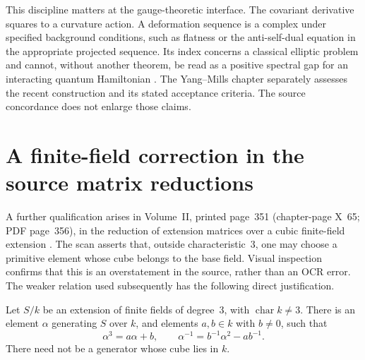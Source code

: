 This discipline matters at the gauge-theoretic interface. The covariant
derivative squares to a curvature action. A deformation sequence is a
complex under specified background conditions, such as flatness or the
anti-self-dual equation in the appropriate projected sequence. Its index
concerns a classical elliptic problem and cannot, without another theorem,
be read as a positive spectral gap for an interacting quantum Hamiltonian
\cite{v2AHS1978,v2AB1983}. The Yang--Mills chapter separately assesses the
recent construction and its stated acceptance criteria. The source
concordance does not enlarge those claims.

\section{A finite-field correction in the source matrix reductions}

A further qualification arises in Volume~II, printed page~351
(chapter-page X~65; PDF page~356), in the reduction of extension matrices
over a cubic finite-field extension \cite{v2Roggenkamp1970II}. The scan
asserts that, outside characteristic~3, one may choose a primitive element
whose cube belongs to the base field. Visual inspection confirms that this
is an overstatement in the source, rather than an OCR error. The weaker
relation used subsequently has the following direct justification.

\begin{proposition}
Let \(S/k\) be an extension of finite fields of degree~3, with
\(\operatorname{char}k\ne3\). There is an element \(\alpha\) generating
\(S\) over \(k\), and elements \(a,b\in k\) with \(b\ne0\), such that
\[
 \alpha^3=a\alpha+b,
 \qquad
 \alpha^{-1}=b^{-1}\alpha^2-ab^{-1}.
\]
There need not be a generator whose cube lies in \(k\).
\end{proposition}

